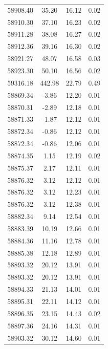 \begin{longtable}{|c|c|c|c|}
 58908.40 &   35.20 &       16.12 &          0.02 \\
 58910.30 &   37.10 &       16.23 &          0.02 \\
 58911.28 &   38.08 &       16.27 &          0.02 \\
 58912.36 &   39.16 &       16.30 &          0.02 \\
 58921.27 &   48.07 &       16.58 &          0.03 \\
 58923.30 &   50.10 &       16.56 &          0.02 \\
 59316.18 &  442.98 &       22.79 &          0.49 \\
 58869.34 &   -3.86 &       12.20 &          0.01 \\
 58870.31 &   -2.89 &       12.18 &          0.01 \\
 58871.33 &   -1.87 &       12.12 &          0.01 \\
 58872.34 &   -0.86 &       12.12 &          0.01 \\
 58872.34 &   -0.86 &       12.06 &          0.01 \\
 58874.35 &    1.15 &       12.19 &          0.02 \\
 58875.37 &    2.17 &       12.11 &          0.01 \\
 58876.32 &    3.12 &       12.12 &          0.01 \\
 58876.32 &    3.12 &       12.23 &          0.01 \\
 58876.32 &    3.12 &       12.38 &          0.01 \\
 58882.34 &    9.14 &       12.54 &          0.01 \\
 58883.39 &   10.19 &       12.66 &          0.01 \\
 58884.36 &   11.16 &       12.78 &          0.01 \\
 58885.38 &   12.18 &       12.89 &          0.01 \\
 58893.32 &   20.12 &       13.91 &          0.01 \\
 58893.32 &   20.12 &       13.91 &          0.01 \\
 58894.33 &   21.13 &       14.01 &          0.01 \\
 58895.31 &   22.11 &       14.12 &          0.01 \\
 58896.35 &   23.15 &       14.43 &          0.02 \\
 58897.36 &   24.16 &       14.31 &          0.01 \\
 58903.32 &   30.12 &       14.60 &          0.01 \\

\end{longtable}
